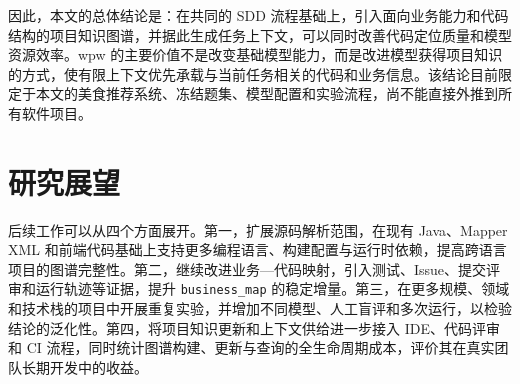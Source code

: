 因此，本文的总体结论是：在共同的 SDD 流程基础上，引入面向业务能力和代码结构的项目知识图谱，并据此生成任务上下文，可以同时改善代码定位质量和模型资源效率。wpw 的主要价值不是改变基础模型能力，而是改进模型获得项目知识的方式，使有限上下文优先承载与当前任务相关的代码和业务信息。该结论目前限定于本文的美食推荐系统、冻结题集、模型配置和实验流程，尚不能直接外推到所有软件项目。


\section{研究展望}
后续工作可以从四个方面展开。第一，扩展源码解析范围，在现有 Java、Mapper XML 和前端代码基础上支持更多编程语言、构建配置与运行时依赖，提高跨语言项目的图谱完整性。第二，继续改进业务—代码映射，引入测试、Issue、提交评审和运行轨迹等证据，提升 \texttt{business\_map} 的稳定增量。第三，在更多规模、领域和技术栈的项目中开展重复实验，并增加不同模型、人工盲评和多次运行，以检验结论的泛化性。第四，将项目知识更新和上下文供给进一步接入 IDE、代码评审和 CI 流程，同时统计图谱构建、更新与查询的全生命周期成本，评价其在真实团队长期开发中的收益。
